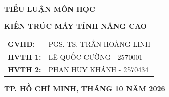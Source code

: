 \begin{titlepage}
\vspace{1.2cm}

{\fontsize{14pt}{\baselineskip}\selectfont \bfseries TIỂU LUẬN MÔN HỌC \par}
\vspace{1.0cm}

{\fontsize{20pt}{\baselineskip}\selectfont \bfseries KIẾN TRÚC MÁY TÍNH NÂNG CAO \par}

\vfill

\begin{raggedleft}
\begin{minipage}{0.5\textwidth}
    \fontsize{14pt}{\baselineskip}\selectfont
    \begin{tabular}{ll}
        \textbf{GVHD:} & PGS. TS. TRẦN HOÀNG LINH \\
        \textbf{HVTH 1:} & LÊ QUỐC CƯỜNG - 2570001\\
        \textbf{HVTH 2:} & PHAN HUY KHÁNH - 2570434 \\
    \end{tabular}
\end{minipage}
\end{raggedleft}

\vspace{5.5cm}

{\fontsize{14pt}{\baselineskip}\selectfont \bfseries TP. HỒ CHÍ MINH, THÁNG 10 NĂM 2026 \par}

\end{titlepage}